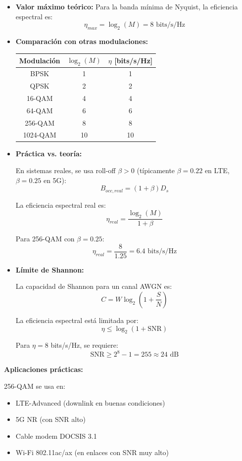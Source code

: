 \documentclass[11pt,a4paper]{article}
\begin{document}
\begin{itemize}
    \item \textbf{Valor m\'aximo te\'orico:} Para la banda m\'inima de Nyquist, la eficiencia espectral es:
    \[
    \eta_{max} = \log_2(M) = 8 \text{ bits/s/Hz}
    \]
    
    \item \textbf{Comparaci\'on con otras modulaciones:}
    \begin{center}
    \begin{tabular}{|c|c|c|}
    \hline
    \textbf{Modulaci\'on} & \textbf{$\log_2(M)$} & \textbf{$\eta$ [bits/s/Hz]} \\
    \hline
    BPSK & 1 & 1 \\
    QPSK & 2 & 2 \\
    16-QAM & 4 & 4 \\
    64-QAM & 6 & 6 \\
    256-QAM & 8 & 8 \\
    1024-QAM & 10 & 10 \\
    \hline
    \end{tabular}
    \end{center}
    
    \item \textbf{Pr\'actica vs. teor\'ia:}
    
    En sistemas reales, se usa roll-off $\beta > 0$ (t\'ipicamente $\beta = 0.22$ en LTE, $\beta = 0.25$ en 5G):
    \[
    B_{occ,real} = (1 + \beta) D_s
    \]
    
    La eficiencia espectral real es:
    \[
    \eta_{real} = \frac{\log_2(M)}{1 + \beta}
    \]
    
    Para 256-QAM con $\beta = 0.25$:
    \[
    \eta_{real} = \frac{8}{1.25} = 6.4 \text{ bits/s/Hz}
    \]
    
    \item \textbf{L\'imite de Shannon:}
    
    La capacidad de Shannon para un canal AWGN es:
    \[
    C = W \log_2\left(1 + \frac{S}{N}\right)
    \]
    
    La eficiencia espectral est\'a limitada por:
    \[
    \eta \leq \log_2\left(1 + \text{SNR}\right)
    \]
    
    Para $\eta = 8$ bits/s/Hz, se requiere:
    \[
    \text{SNR} \geq 2^8 - 1 = 255 \approx 24 \text{ dB}
    \]
\end{itemize}

\textbf{Aplicaciones pr\'acticas:}

256-QAM se usa en:
\begin{itemize}
    \item LTE-Advanced (downlink en buenas condiciones)
    \item 5G NR (con SNR alto)
    \item Cable modem DOCSIS 3.1
    \item Wi-Fi 802.11ac/ax (en enlaces con SNR muy alto)
\end{itemize}
\end{document}
